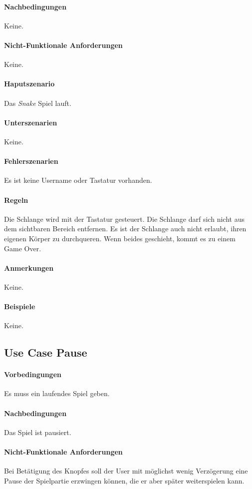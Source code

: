 \documentclass[a4paper, twosided, 11pt]{scrartcl}
\begin{document}
\paragraph{Nachbedingungen} Keine.
\paragraph{Nicht-Funktionale Anforderungen} Keine.
\paragraph{Haputszenario} Das \emph{Snake} Spiel lauft.
\paragraph{Unterszenarien} Keine.
\paragraph{Fehlerszenarien} Es ist keine Username oder Tastatur vorhanden.
\paragraph{Regeln}
Die Schlange wird mit der Tastatur gesteuert. Die Schlange darf sich nicht aus
dem sichtbaren Bereich entfernen. Es ist der Schlange auch nicht erlaubt, ihren
eigenen Körper zu durchqueren. Wenn beides geschieht, kommt es zu einem Game
Over.

\paragraph{Anmerkungen} Keine.
\paragraph{Beispiele} Keine.

\subsection{Use Case Pause}
\paragraph{Vorbedingungen} Es muss ein laufendes Spiel geben.
\paragraph{Nachbedingungen} Das Spiel ist pausiert.

\paragraph{Nicht-Funktionale Anforderungen} Bei Betätigung des Knopfes soll der
User mit möglichst wenig Verzögerung eine Pause der Spielpartie erzwingen
können, die er aber später weiterspielen kann.
\end{document}
